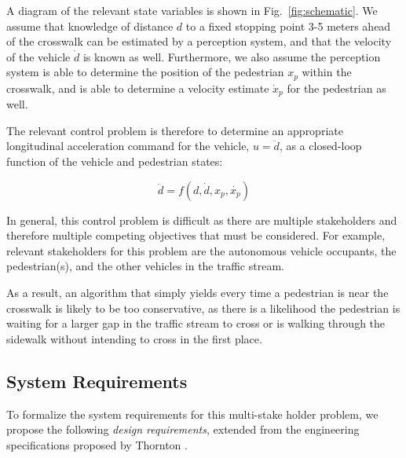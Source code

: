 \documentclass[letterpaper, 10 pt, conference]{ieeeconf}  %
\begin{document}
A diagram of the relevant state variables is shown in Fig.~\ref{fig:schematic}. We assume that knowledge of distance $d$ to a fixed stopping point 3-5 meters ahead of the crosswalk can be estimated by a perception system, and that the velocity of the vehicle $\dot{d}$ is known as well. Furthermore, we also assume the perception system is able to determine the position of the pedestrian $x_p$ within the crosswalk, and is able to determine a velocity estimate $\dot{x}_p$ for the pedestrian as well. 


The relevant control problem is therefore to determine an appropriate longitudinal acceleration command for the vehicle, $u = \ddot{d}$, as a closed-loop function of the vehicle and pedestrian states:

\begin{equation}
\ddot{d} = f(d, \dot{d}, x_p, \dot{x_p})
\end{equation}

In general, this control problem is difficult as there are multiple stakeholders and therefore multiple competing objectives that must be considered. For example, relevant stakeholders for this problem are the autonomous vehicle occupants, the pedestrian(s), and the other vehicles in the traffic stream. 

As a result, an algorithm that simply yields every time a pedestrian is near the crosswalk is likely to be too conservative, as there is a likelihood the pedestrian is waiting for a larger gap in the traffic stream to cross or is walking through the sidewalk without intending to cross in the first place. 

\subsection{System Requirements}

To formalize the system requirements for this multi-stake holder problem, we propose the following \textit{design requirements}, extended from the engineering specifications proposed by Thornton \cite{Thornton2018}. 
\end{document}
